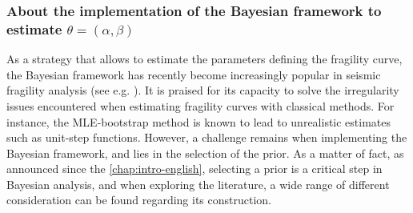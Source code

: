  




\subsubsection{About the implementation of the Bayesian framework to estimate $\theta=(\alpha,\beta)$}

As a strategy that allows to estimate the parameters defining the fragility curve, 
the Bayesian framework has recently become increasingly popular in seismic fragility analysis (see e.g. \cite{gardoni_probabilistic_2002,wang_bayesian_2018,katayama_bayesian-estimation-based_2021,koutsourelakis_assessing_2010,damblin_approche_2014,tadinada_structural_2017,kwag_computationally_2018,jeon_parameterized_2019,tabandeh_physics-based_2020}). 
It is praised for its capacity to solve the irregularity issues encountered when estimating fragility curves with classical methods. For instance, the MLE-bootstrap method is known to lead to unrealistic estimates such as unit-step functions.
However, a challenge remains when %
implementing the Bayesian framework, and 
lies in the selection of the prior.
As a matter of fact, as announced since the \cref{chap:intro-english}, selecting a prior is a critical step in Bayesian analysis, %
and when exploring the literature, a wide range of different consideration can be found regarding its construction. %
%

